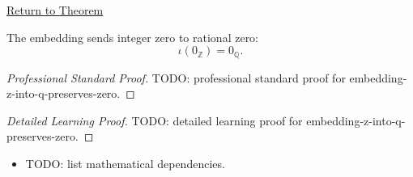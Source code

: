 \newpage
{}
\label{prf:embedding-z-into-q-preserves-zero}

\begin{remark*}[Return]
\hyperref[thm:embedding-z-into-q-preserves-zero]{Return to Theorem}
\end{remark*}

\begin{theorem*}
The embedding sends integer zero to rational zero:
\[
\iota(0_{\mathbb{Z}})=0_{\mathbb{Q}}.
\]
\end{theorem*}

\begin{proof}[Professional Standard Proof]
\LRAProofBodyStart
TODO: professional standard proof for embedding-z-into-q-preserves-zero.
\end{proof}

\begin{proof}[Detailed Learning Proof]
\LRAProofBodyStart
TODO: detailed learning proof for embedding-z-into-q-preserves-zero.
\end{proof}

\begin{remark*}
\end{remark*}

\begin{dependencies}
\begin{itemize}
  \item TODO: list mathematical dependencies.
\end{itemize}
\end{dependencies}

\clearpage
